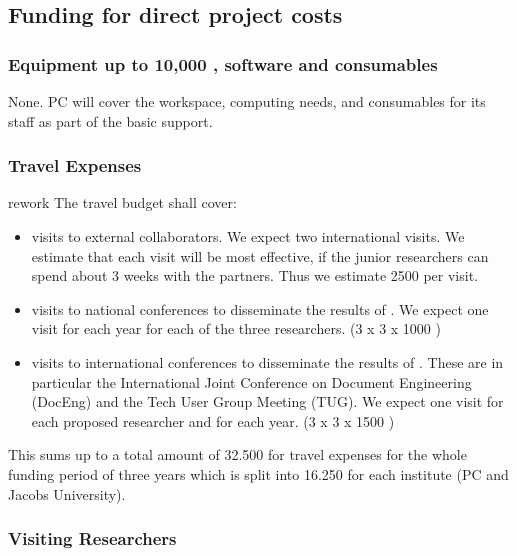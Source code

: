 \subsection{Funding for direct project costs}

\subsubsection{Equipment up to 10,000 \texteuro, software and consumables}

None.  PC will cover the workspace, computing needs, and consumables for its staff as part
of the basic support.

\subsubsection{Travel Expenses}\label{sec:travel}

\begin{oldpart}{rework}
  The travel budget shall cover:
  \begin{itemize}
  \item visits to external collaborators. We expect two international visits. We estimate
    that each visit will be most effective, if the junior researchers can spend about 3
    weeks with the partners. Thus we estimate 2500 {\texteuro} per visit.
  \item visits to national conferences to disseminate the results of {\pn}. We expect
    one visit for each year for each of the three researchers. (3 x 3 x 1000 {\texteuro})
  \item visits to international conferences to disseminate the results of {\pn}. These
    are in particular the International Joint Conference on Document Engineering (DocEng)
    and the Tech User Group Meeting (TUG). We expect one visit for each proposed
    researcher and for each year. (3 x 3 x 1500 {\texteuro})
  \end{itemize}

  This sums up to a total amount of 32.500 {\texteuro} for travel expenses for the whole
  funding period of three years which is split into 16.250 {\texteuro} for each institute
  (PC and Jacobs University).
\end{oldpart}

\subsubsection{Visiting Researchers}

